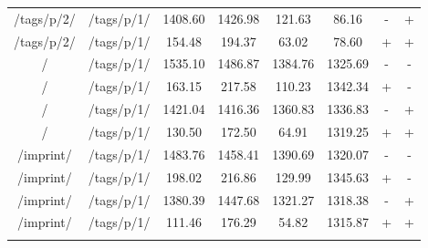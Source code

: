 \begin{appendix}
\begin{center}
\begin{longtable}{cccccccc}
/tags/p/2/ & /tags/p/1/ & 1408.60 & 1426.98 & 121.63 & 86.16 & - & + \\
/tags/p/2/ & /tags/p/1/ & 154.48 & 194.37 & 63.02 & 78.60 & + & + \\
\hline
\hline
/ & /tags/p/1/ & 1535.10 & 1486.87 & 1384.76 & 1325.69 & - & - \\
/ & /tags/p/1/ & 163.15 & 217.58 & 110.23 & 1342.34 & + & - \\
/ & /tags/p/1/ & 1421.04 & 1416.36 & 1360.83 & 1336.83 & - & + \\
/ & /tags/p/1/ & 130.50 & 172.50 & 64.91 & 1319.25 & + & + \\
\hline
/imprint/ & /tags/p/1/ & 1483.76 & 1458.41 & 1390.69 & 1320.07 & - & - \\
/imprint/ & /tags/p/1/ & 198.02 & 216.86 & 129.99 & 1345.63 & + & - \\
/imprint/ & /tags/p/1/ & 1380.39 & 1447.68 & 1321.27 & 1318.38 & - & + \\
/imprint/ & /tags/p/1/ & 111.46 & 176.29 & 54.82 & 1315.87 & + & + \\
\hline
\label{tab:selenium_results_external}
\end{longtable}
\end{center}
\end{appendix}